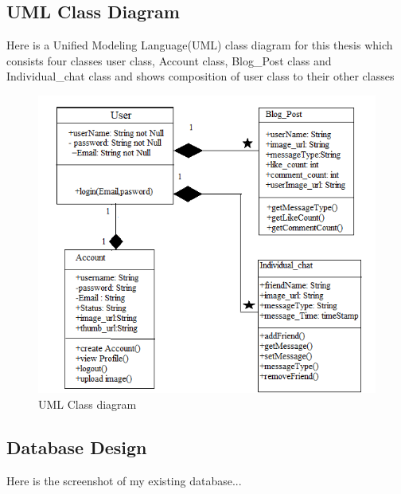\subsection{UML Class Diagram}
Here is a Unified Modeling Language(UML) class diagram for this thesis which consists four classes user class, Account class, Blog\_Post class and Individual\_chat class and shows  composition of user class to their other classes

\begin{figure}[!ht]
	\centering
	\includegraphics[scale=1]{project-uml.png}
	\caption{\label{img8}  UML Class diagram}
\end{figure}
\vspace{10ex}
\subsection{Database Design}
Here is the screenshot of my existing database...
\bigskip
\noindent

